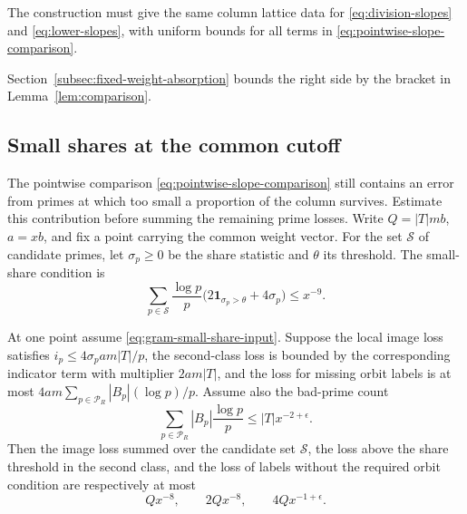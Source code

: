 The construction must give the same column lattice data for
\eqref{eq:division-slopes} and \eqref{eq:lower-slopes}, with
uniform bounds for all terms in \eqref{eq:pointwise-slope-comparison}.

Section~\ref{subsec:fixed-weight-absorption} bounds the right side by the bracket in Lemma~\ref{lem:comparison}. \label{cor:frames-7}

\subsection{Small shares at the common cutoff}
\label{subsec:small-share-slope}

The pointwise comparison \eqref{eq:pointwise-slope-comparison} still contains an error from primes at which too small a proportion of the column survives. Estimate this contribution before summing the remaining prime losses. Write \(Q=|T|mb\), \(a=xb\), and fix a
point carrying the common weight vector. For the set
\(\mathcal S\) of candidate primes, let \(\sigma_p\ge0\)
be the share statistic and \(\theta\) its threshold. The small-share condition is
\begin{equation}\label{eq:gram-small-share-input}
 \sum_{p\in\mathcal S}\frac{\log p}{p}
        \bigl(2\mathbf1_{\sigma_p>\theta}+4\sigma_p\bigr)
       \le x^{-9}.
\end{equation}
\begin{lemma}\label{lem:three-share-losses}
At one point assume \eqref{eq:gram-small-share-input}. Suppose the
local image loss satisfies \(i_p\le 4\sigma_p a m|T|/p\), the
second-class loss is bounded by the corresponding indicator term
with multiplier \(2am|T|\), and the loss for missing orbit labels
is at most \(4am\sum_{p\in\mathcal P_R}|B_p|(\log p)/p\).
Assume also the bad-prime count
\[
 \sum_{p\in\mathcal P_R}|B_p|\frac{\log p}{p}\le |T|x^{-2+\epsilon}.
\]
Then the image loss summed over the candidate set \(\mathcal S\),
the loss above the share threshold in the second class, and the loss
of labels without the required orbit condition are respectively at most
\[
 Qx^{-8},\qquad 2Qx^{-8},\qquad 4Qx^{-1+\epsilon}.
\]
\end{lemma}

